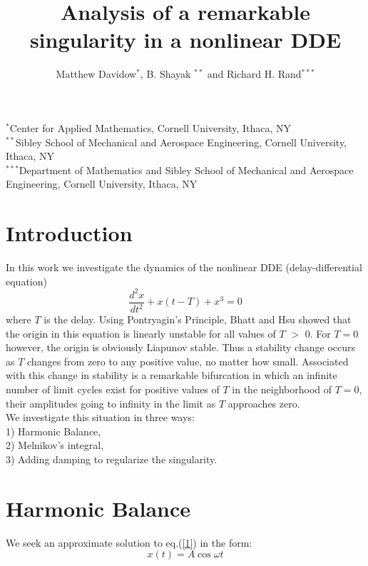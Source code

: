 \documentclass[12pt]{article}
\begin{document}
	\title{Analysis of a remarkable singularity in a nonlinear DDE }
	\author {Matthew Davidow$^\ast$, B. Shayak $^{\ast\ast}$ and {Richard H. Rand}$^{\ast\ast\ast}$}
	\date{}
		\maketitle 
{$^\ast$Center for Applied Mathematics, Cornell University, Ithaca, NY \\  
		$^{\ast\ast}$Sibley School of Mechanical and Aerospace Engineering, Cornell University, Ithaca, NY \\
		$^{\ast\ast\ast}$Department of Mathematics and Sibley School of Mechanical and Aerospace Engineering, Cornell University, Ithaca, NY }
	\section{Introduction}
In this work we investigate the dynamics of the nonlinear DDE (delay-differential equation)
\begin{equation}
\frac{d^2x}{dt^2}+x(t-T)+x^3 = 0
\label{1} 
\end{equation}
where $T$ is the delay.  Using Pontryagin's Principle, Bhatt and Hsu \cite{bhatt} showed that the origin in this equation is linearly unstable for 
all values of $T$ $>$ 0.  For $T=0$ however, the origin is obviously Liapunov stable.  Thus a stability change occurs as $T$ changes from zero to 
any  positive value, no matter how small. Associated with this change in stability is a remarkable bifurcation in which an infinite number of limit cycles exist for positive values of $T$ in the neighborhood of $T = 0$, their amplitudes going to infinity in the limit as $T$ approaches zero.\\

We investigate this situation in three ways:\\
1) Harmonic Balance,\\
2) Melnikov's integral,\\
3) Adding damping to regularize the singularity.\\

\section{Harmonic Balance}

We seek an approximate solution to eq.(\ref{1}) in the form:
\begin{equation}
x(t) = A \cos \omega t 
\label{2} 
\end{equation}
\end{document}
